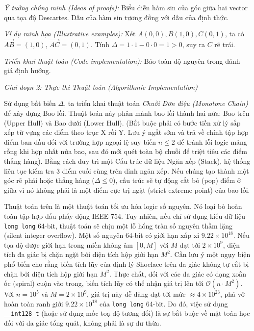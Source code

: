 \documentclass{article}
\begin{document}
\emph{Ý tưởng chứng minh (Ideas of proofs):} Biểu diễn hàm sin của góc giữa hai vector qua tọa độ Descartes. Dấu của hàm sin tương đồng với dấu của định thức.

\emph{Ví dụ minh họa (Illustrative examples):} Xét $A(0,0), B(1,0), C(0,1)$, ta có $\vec{AB} = (1,0)$, $\vec{AC} = (0,1)$. Tính $\Delta = 1 \cdot 1 - 0 \cdot 0 = 1 > 0$, suy ra $C$ rẽ trái.

\emph{Triển khai thuật toán (Code implementation):}
Bảo toàn độ nguyên trong đánh giá định hướng.


\vspace{0.5em}\noindent\emph{Giai đoạn 2: Thực thi Thuật toán (Algorithmic Implementation)}

Sử dụng bất biến $\Delta$, ta triển khai thuật toán \textit{Chuỗi Đơn điệu (Monotone Chain)} để xây dựng Bao lồi. Thuật toán này phân mảnh bao lồi thành hai nửa: Bao trên (Upper Hull) và Bao dưới (Lower Hull). (Bắt buộc phải có bước tiền xử lý sắp xếp từ vựng các điểm theo trục X rồi Y. Lưu ý ngắt sớm và trả về chính tập hợp điểm ban đầu đối với trường hợp ngoại lệ suy biến $n \le 2$ để tránh lỗi logic mảng rỗng khi hợp nhất nửa bao, sau đó mới quét toàn bộ chuỗi để triệt tiêu các điểm thẳng hàng). Bằng cách duy trì một Cấu trúc dữ liệu Ngăn xếp (Stack), hệ thống liên tục kiểm tra 3 điểm cuối cùng trên đỉnh ngăn xếp. Nếu chúng tạo thành một góc rẽ phải hoặc thẳng hàng ($\Delta \le 0$), cấu trúc sẽ tự động cắt bỏ (pop) điểm ở giữa vì nó không phải là một điểm cực trị ngặt (strict extreme point) của bao lồi.

Thuật toán trên là một thuật toán tối ưu hóa logic số nguyên. Nó loại bỏ hoàn toàn tập hợp dấu phẩy động IEEE 754. Tuy nhiên, nếu chỉ sử dụng kiểu dữ liệu \texttt{long long} 64-bit, thuật toán sẽ chịu một lỗ hổng tràn số nguyên thầm lặng (silent integer overflow). Một số nguyên 64-bit có giới hạn xấp xỉ $9.22 \times 10^{18}$. Nếu tọa độ được giới hạn trong miền không âm $[0, M]$ với $M$ đạt tới $2 \times 10^9$, diện tích đa giác bị chặn ngặt bởi diện tích hộp giới hạn $M^2$. Cần lưu ý một ngụy biện phổ biến cho rằng biến tích lũy của định lý Shoelace trên đa giác không tự cắt bị chặn bởi diện tích hộp giới hạn $M^2$. Thực chất, đối với các đa giác có dạng xoắn ốc (spiral) cuộn vào trong, biến tích lũy có thể nhận giá trị lên tới $\mathcal{O}(n \cdot M^2)$. Với $n=10^5$ và $M = 2 \times 10^9$, giá trị này dễ dàng đạt tới mức $\approx 4 \times 10^{23}$, phá vỡ hoàn toàn ranh giới $9.22 \times 10^{18}$ của \texttt{long long} 64-bit. Do đó, việc sử dụng \texttt{\_\_int128\_t} (hoặc sử dụng mốc toạ độ tương đối) là sự bắt buộc về mặt toán học đối với đa giác tổng quát, không phải là sự dư thừa.
\end{document}
